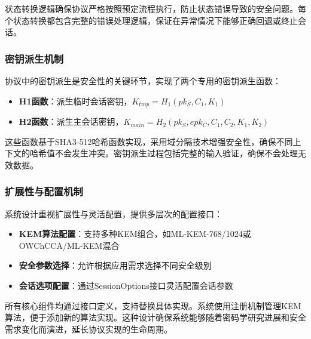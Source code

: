 状态转换逻辑确保协议严格按照预定流程执行，防止状态错误导致的安全问题。每个状态转换都包含完整的错误处理逻辑，保证在异常情况下能够正确回退或终止会话。

\subsubsection{密钥派生机制}

协议中的密钥派生是安全性的关键环节，实现了两个专用的密钥派生函数：

\begin{itemize}
    \item \textbf{H1函数}：派生临时会话密钥，$K_{tmp} = H_1(pk_S, C_1, K_1)$
    \item \textbf{H2函数}：派生主会话密钥，$K_{main} = H_2(pk_S, epk_C, C_1, C_2, K_1, K_2)$
\end{itemize}

这些函数基于SHA3-512哈希函数实现，采用域分隔技术增强安全性，确保不同上下文的哈希值不会发生冲突。密钥派生过程包括完整的输入验证，确保不会处理无效数据。

\subsubsection{扩展性与配置机制}

系统设计重视扩展性与灵活配置，提供多层次的配置接口：

\begin{itemize}
    \item \textbf{KEM算法配置}：支持多种KEM组合，如ML-KEM-768/1024或OWChCCA/ML-KEM混合
    \item \textbf{安全参数选择}：允许根据应用需求选择不同安全级别
    \item \textbf{会话选项配置}：通过SessionOptions接口灵活配置会话参数
\end{itemize}

所有核心组件均通过接口定义，支持替换具体实现。系统使用注册机制管理KEM算法，便于添加新的算法实现。这种设计确保系统能够随着密码学研究进展和安全需求变化而演进，延长协议实现的生命周期。